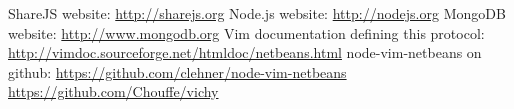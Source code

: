 \documentclass{llncs}
\begin{document}
\begin{thebibliography}{1}

ShareJS website: \url{http://sharejs.org}
Node.js website: \url{http://nodejs.org}
MongoDB website: \url{http://www.mongodb.org}
Vim documentation defining this protocol: \url{http://vimdoc.sourceforge.net/htmldoc/netbeans.html}
node-vim-netbeans on github: \url{https://github.com/clehner/node-vim-netbeans}
\url{https://github.com/Chouffe/vichy}

\end{thebibliography}
\end{document}
